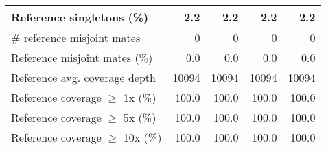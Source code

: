 \documentclass[12pt,a4paper]{article}
\begin{document}
\begin{table}[ht]
\begin{center}
\begin{tabular}{|l*{4}{|r}|}
Reference singletons (\%) & 2.2 & 2.2 & 2.2 & 2.2 \\ \hline
\# reference misjoint mates & 0 & 0 & 0 & 0 \\ \hline
Reference misjoint mates (\%) & 0.0 & 0.0 & 0.0 & 0.0 \\ \hline
Reference avg. coverage depth & 10094 & 10094 & 10094 & 10094 \\ \hline
Reference coverage $\geq$ 1x (\%) & 100.0 & 100.0 & 100.0 & 100.0 \\ \hline
Reference coverage $\geq$ 5x (\%) & 100.0 & 100.0 & 100.0 & 100.0 \\ \hline
Reference coverage $\geq$ 10x (\%) & 100.0 & 100.0 & 100.0 & 100.0 \\ \hline
\end{tabular}
\end{center}
\end{table}
\end{document}
